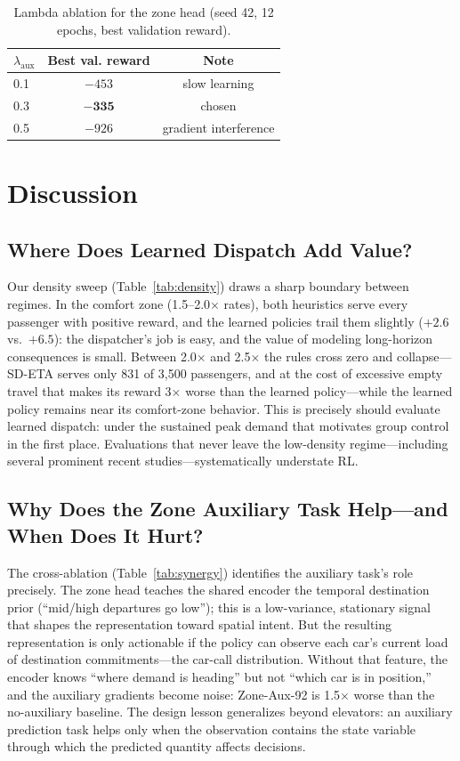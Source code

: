 \documentclass{ieeeaccess}
\begin{document}
\begin{table}[t]
\centering
\caption{Lambda ablation for the zone head (seed 42, 12 epochs,
best validation reward).}
\label{tab:lambda}
\begin{tabular}{@{}lcc@{}}
\toprule
$\lambda_{\text{aux}}$ & Best val. reward & Note \\
\midrule
0.1 & $-453$ & slow learning \\
$\mathbf{0.3}$ & $\mathbf{-335}$ & chosen \\
0.5 & $-926$ & gradient interference \\
\bottomrule
\end{tabular}
\end{table}

\section{Discussion}
\label{sec:discussion}

\subsection{Where Does Learned Dispatch Add Value?}

Our density sweep (Table~\ref{tab:density}) draws a sharp boundary
between regimes. In the comfort zone (1.5--2.0$\times$ rates), both
heuristics serve every passenger with positive reward, and the
learned policies trail them slightly ($+2.6$ vs.~$+6.5$): the
dispatcher's job is easy, and the value of modeling long-horizon
consequences is small. Between 2.0$\times$ and 2.5$\times$ the rules
cross zero and collapse---SD-ETA serves only 831 of 3{,}500
passengers, and at the cost of excessive empty travel that makes its
reward 3$\times$ worse than the learned policy---while the learned
policy remains near its comfort-zone
behavior. This is precisely
should evaluate learned dispatch: under the sustained peak demand
that motivates group control in the first place. Evaluations that
never leave the low-density regime---including several prominent
recent studies---systematically understate RL.

\subsection{Why Does the Zone Auxiliary Task Help---and When Does It Hurt?}

The cross-ablation (Table~\ref{tab:synergy}) identifies the
auxiliary task's role precisely. The zone head teaches the shared
encoder the temporal destination prior (``mid/high departures go
low''); this is a low-variance, stationary signal that shapes the
representation toward spatial intent. But the resulting
representation is only actionable if the policy can observe each
car's current load of destination commitments---the car-call
distribution. Without that feature, the encoder knows ``where demand
is heading'' but not ``which car is in position,'' and the auxiliary
gradients become noise: Zone-Aux-92 is 1.5$\times$ worse than the
no-auxiliary baseline. The design lesson generalizes beyond
elevators: an auxiliary prediction task helps only when the
observation contains the state variable through which the predicted
quantity affects decisions.
\end{document}
